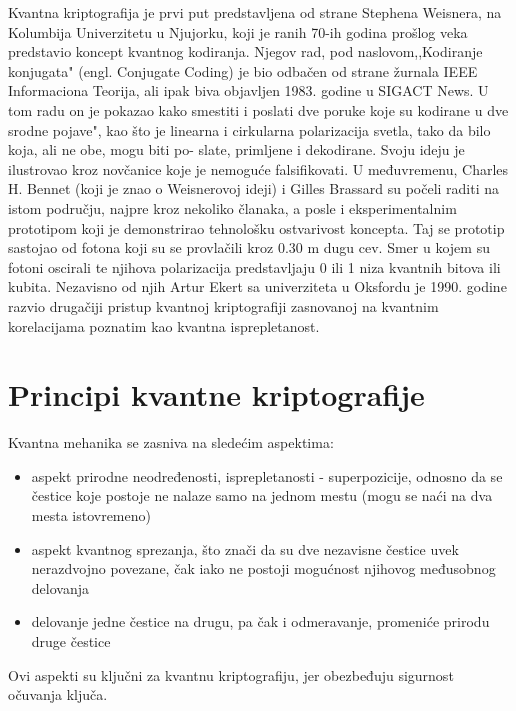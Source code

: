 \documentclass[a4paper]{article}
\begin{document}
{Kvantna kriptografija je prvi put predstavljena\cite{draganakvantna} od strane Stephena Weisnera, na Kolumbija Univerzitetu u Njujorku, koji je ranih 70-ih godina prošlog veka predstavio koncept kvantnog kodiranja. Njegov rad, pod naslovom,,Kodiranje konjugata" (engl. Conjugate Coding) je bio odbačen od strane žurnala IEEE Informaciona Teorija, ali ipak biva objavljen 1983. godine u SIGACT News. U tom radu on je pokazao kako smestiti i poslati dve poruke koje su kodirane u dve srodne pojave", kao što je linearna i cirkularna polarizacija svetla, tako da bilo koja, ali ne obe, mogu biti po- slate, primljene i dekodirane. Svoju ideju je ilustrovao kroz novčanice koje je nemoguće falsifikovati. U međuvremenu, Charles H. Bennet\cite{sandrakvantna} (koji je znao o Weisnerovoj ideji) i Gilles Brassard su počeli raditi na istom području, najpre kroz nekoliko članaka, a posle i eksperimentalnim prototipom koji je demonstrirao tehnološku ostvarivost koncepta. Taj se prototip sastojao od fotona koji su se provlačili kroz 0.30 m dugu cev. Smer u kojem su fotoni oscirali te njihova polarizacija predstavljaju 0 ili 1 niza kvantnih bitova ili kubita. Nezavisno od njih Artur Ekert sa univerziteta u Oksfordu je 1990. godine razvio drugačiji pristup kvantnoj kriptografiji zasnovanoj na kvantnim korelacijama poznatim kao kvantna isprepletanost.
\section{Principi kvantne kriptografije}
Kvantna mehanika\cite{stevankvantna} se zasniva na sledećim aspektima:
\begin{itemize}
\item aspekt prirodne neodređenosti, isprepletanosti - superpozicije, odnosno da se čestice koje postoje ne nalaze samo na jednom mestu (mogu se naći na dva mesta istovremeno)
\item aspekt kvantnog sprezanja, što znači da su dve nezavisne čestice uvek nerazdvojno povezane, čak iako ne postoji mogućnost njihovog međusobnog delovanja
\item delovanje jedne čestice na drugu, pa čak i odmeravanje, promeniće prirodu druge čestice
\end{itemize}
Ovi aspekti su ključni za kvantnu kriptografiju, jer obezbeđuju sigurnost očuvanja ključa.
}
\end{document}
